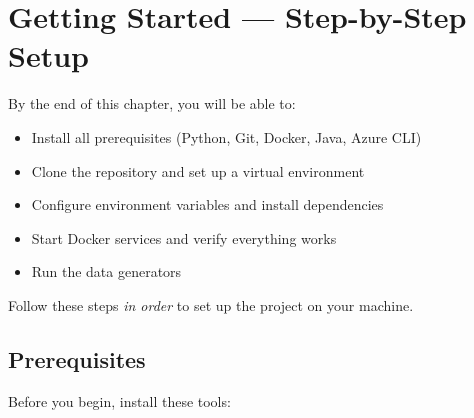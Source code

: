 \documentclass[12pt, a4paper, oneside]{report}
\begin{document}
\chapter{Getting Started --- Step-by-Step Setup}
\label{ch:setup}

\begin{objectivebox}
By the end of this chapter, you will be able to:
\begin{itemize}
    \item Install all prerequisites (Python, Git, Docker, Java, Azure CLI)
    \item Clone the repository and set up a virtual environment
    \item Configure environment variables and install dependencies
    \item Start Docker services and verify everything works
    \item Run the data generators
\end{itemize}
\end{objectivebox}

Follow these steps \textit{in order} to set up the project on your machine.

\section{Prerequisites}

Before you begin, install these tools:
\end{document}
